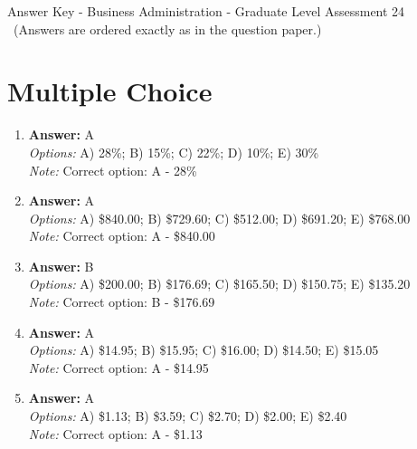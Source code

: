 \documentclass[12pt]{article}
\begin{document}
\begin{center}
Answer Key - Business Administration - Graduate Level Assessment 24 \
\small (Answers are ordered exactly as in the question paper.)
\end{center}

\section*{Multiple Choice}
\begin{enumerate}[label=\arabic*.]
\item \textbf{Answer:} A
\\ \textit{Options:} A) 28\%; B) 15\%; C) 22\%; D) 10\%; E) 30\%
\\ \textit{Note:} Correct option: A - 28\%
\item \textbf{Answer:} A
\\ \textit{Options:} A) \$840.00; B) \$729.60; C) \$512.00; D) \$691.20; E) \$768.00
\\ \textit{Note:} Correct option: A - \$840.00
\item \textbf{Answer:} B
\\ \textit{Options:} A) \$200.00; B) \$176.69; C) \$165.50; D) \$150.75; E) \$135.20
\\ \textit{Note:} Correct option: B - \$176.69
\item \textbf{Answer:} A
\\ \textit{Options:} A) \$14.95; B) \$15.95; C) \$16.00; D) \$14.50; E) \$15.05
\\ \textit{Note:} Correct option: A - \$14.95
\item \textbf{Answer:} A
\\ \textit{Options:} A) \$1.13; B) \$3.59; C) \$2.70; D) \$2.00; E) \$2.40
\\ \textit{Note:} Correct option: A - \$1.13
\end{enumerate}
\end{document}
